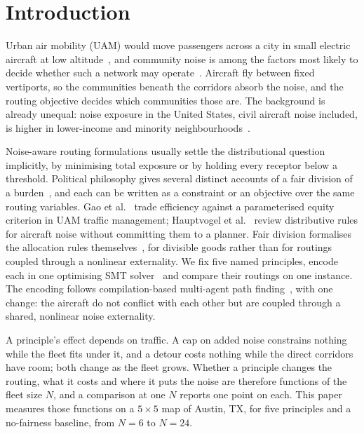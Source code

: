 \section{Introduction}
\label{sec:intro}

Urban air mobility (UAM) would move passengers across a city in small electric aircraft
at low altitude~\cite{cohen2021uam}, and community noise is among the factors most likely
to decide whether such a network may operate~\cite{nasaUAMnoise2020}. Aircraft fly
between fixed vertiports, so the communities beneath the corridors absorb the noise, and
the routing objective decides which communities those are. The background is already
unequal: noise exposure in the United States, civil aircraft noise included, is higher in
lower-income and minority neighbourhoods~\cite{casey2017noise,simon2022sociodemographic}.

Noise-aware routing formulations usually settle the distributional question implicitly,
by minimising total exposure or by holding every receptor below a threshold. Political
philosophy gives several distinct accounts of a fair division of a
burden~\cite{rawls1971,parfit1997,frankfurt1987,sen1979}, and each can be written as a
constraint or an objective over the same routing variables. Gao et
al.~\cite{gao2024noiseaware} trade efficiency against a parameterised equity criterion in
UAM traffic management; Hauptvogel et al.~\cite{hauptvogel2021fairness} review
distributive rules for aircraft noise without committing them to a planner. Fair division
formalises the allocation rules themselves~\cite{moulin2003fair,walsh2020fairdivision},
for divisible goods rather than for routings coupled through a nonlinear externality. We fix five
named principles, encode each in one optimising SMT
solver~\cite{demoura2008z3,bjorner2015nuz} and compare their routings on one instance. The
encoding follows compilation-based multi-agent path
finding~\cite{surynek2019smtmapf,stern2019mapf}, with one change: the aircraft do not
conflict with each other but are coupled through a shared, nonlinear noise externality.

A principle's effect depends on traffic. A cap on added noise constrains nothing while
the fleet fits under it, and a detour costs nothing while the direct corridors have room;
both change as the fleet grows. Whether a principle changes the routing, what it costs
and where it puts the noise are therefore functions of the fleet size $N$, and a
comparison at one $N$ reports one point on each. This paper measures those functions on a
$5\times5$ map of Austin, TX, for five principles and a no-fairness baseline, from $N=6$
to $N=24$.

